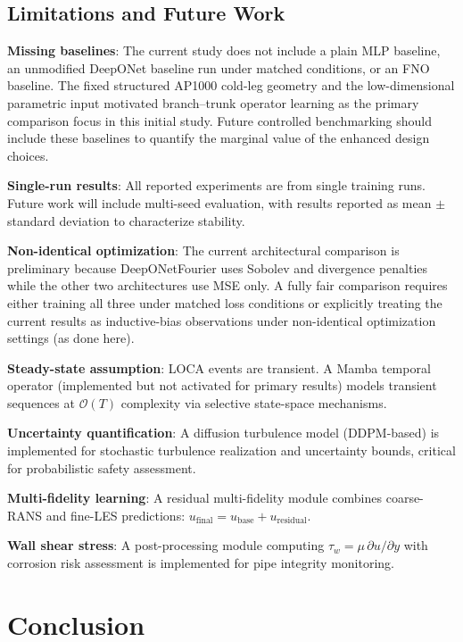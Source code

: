 \documentclass[conference]{IEEEtran}
\begin{document}
\subsection{Limitations and Future Work}

\textbf{Missing baselines}: The current study does not include a plain MLP baseline, an unmodified DeepONet baseline run under matched conditions, or an FNO baseline. The fixed structured AP1000 cold-leg geometry and the low-dimensional parametric input motivated branch--trunk operator learning as the primary comparison focus in this initial study. Future controlled benchmarking should include these baselines to quantify the marginal value of the enhanced design choices.

\textbf{Single-run results}: All reported experiments are from single training runs. Future work will include multi-seed evaluation, with results reported as mean $\pm$ standard deviation to characterize stability.

\textbf{Non-identical optimization}: The current architectural comparison is preliminary because DeepONetFourier uses Sobolev and divergence penalties while the other two architectures use MSE only. A fully fair comparison requires either training all three under matched loss conditions or explicitly treating the current results as inductive-bias observations under non-identical optimization settings (as done here).

\textbf{Steady-state assumption}: LOCA events are transient. A Mamba temporal operator (implemented but not activated for primary results) models transient sequences at $\mathcal{O}(T)$ complexity via selective state-space mechanisms.

\textbf{Uncertainty quantification}: A diffusion turbulence model (DDPM-based) is implemented for stochastic turbulence realization and uncertainty bounds, critical for probabilistic safety assessment.

\textbf{Multi-fidelity learning}: A residual multi-fidelity module combines coarse-RANS and fine-LES predictions: $u_\text{final} = u_\text{base} + u_\text{residual}$.

\textbf{Wall shear stress}: A post-processing module computing $\tau_w = \mu\,\partial u/\partial y$ with corrosion risk assessment is implemented for pipe integrity monitoring.

\section{Conclusion}
\label{sec:conclusion}
\end{document}
